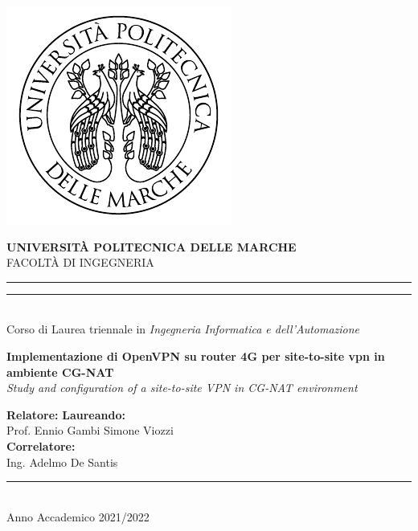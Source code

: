 \begin{titlepage}

\begin{center}
\includegraphics[scale=0.85]{immagini/UnivpmLogo.pdf} \\
\vspace{5mm}

{{\Large{\textbf{\large{UNIVERSITÀ POLITECNICA DELLE MARCHE}}}}} \\
\vspace{3mm}
\small{FACOLTÀ DI INGEGNERIA}\\
\vspace{3.5mm}

\rule[0.1cm]{\textwidth}{0.1mm}
\rule[0.5cm]{\textwidth}{0.6mm} 
\\

\large{{Corso di Laurea triennale in \textit{Ingegneria Informatica e dell'Automazione}}} \\

\end{center}

\vspace{18mm}
\begin{center}
{\LARGE{\bf{Implementazione di OpenVPN su router 4G per site-to-site vpn in ambiente CG-NAT}}}\\
\vspace{6mm}
\Large{\textit{Study and configuration of a site-to-site VPN in CG-NAT environment}}\\
\vspace{15mm}
\end{center}

\vspace{20mm}


\noindent
\textbf{Relatore:}
\hfill
\textbf{Laureando:} \\
\noindent
Prof. Ennio Gambi
\hfill
Simone Viozzi \\
\noindent
\textbf{Correlatore:} \\
Ing. Adelmo De Santis



\vfill
\begin{center}
\rule[0.1cm]{\textwidth}{0.1mm} \\
{\large{
Anno Accademico 2021/2022 }}
\end{center}
\end{titlepage}
\restoregeometry
